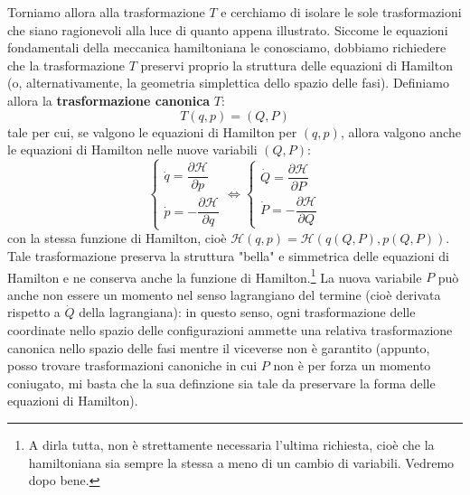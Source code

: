 \documentclass[a4paper,openany]{article}
\begin{document}
Torniamo allora alla trasformazione $T$ e cerchiamo di isolare le sole trasformazioni che siano ragionevoli alla luce di quanto appena illustrato. Siccome le equazioni fondamentali della meccanica hamiltoniana le conosciamo, dobbiamo richiedere che la trasformazione $T$ preservi proprio la struttura delle equazioni di Hamilton (o, alternativamente, la geometria simplettica dello spazio delle fasi). Definiamo allora la \textbf{trasformazione canonica} $T$:
$$
T(q,p) = (Q,P)
$$
tale per cui, se valgono le equazioni di Hamilton per $(q,p)$, allora valgono anche le equazioni di Hamilton nelle nuove variabili $(Q,P)$:
\begin{equation}\label{key}
	\begin{cases}
		\dot{q} = \dfrac{\partial \mathcal{H}}{\partial p} \\
		\dot{p} = -\dfrac{\partial \mathcal{H}}{\partial q}
	\end{cases}
\iff
	\begin{cases}
		\dot{Q} = \dfrac{\partial \mathcal{H}}{\partial P} \\
		\dot{P} = -\dfrac{\partial \mathcal{H}}{\partial Q}
	\end{cases}
\end{equation}
con la stessa funzione di Hamilton, cioè $\mathcal{H}(q,p) = \mathcal{H}(q(Q,P),p(Q,P))$. Tale trasformazione preserva la struttura "bella" e simmetrica delle equazioni di Hamilton e ne conserva anche la funzione di Hamilton.\footnote{A dirla tutta, non è strettamente necessaria l'ultima richiesta, cioè che la hamiltoniana sia sempre la stessa a meno di un cambio di variabili. Vedremo dopo bene.} La nuova variabile $P$ può anche non essere un momento nel senso lagrangiano del termine (cioè derivata rispetto a $\dot{Q}$ della lagrangiana): in questo senso, ogni trasformazione delle coordinate nello spazio delle configurazioni ammette una relativa trasformazione canonica nello spazio delle fasi mentre il viceverse non è garantito (appunto, posso trovare trasformazioni canoniche in cui $P$ non è per forza un momento coniugato, mi basta che la sua definzione sia tale da preservare la forma delle equazioni di Hamilton).
\end{document}
